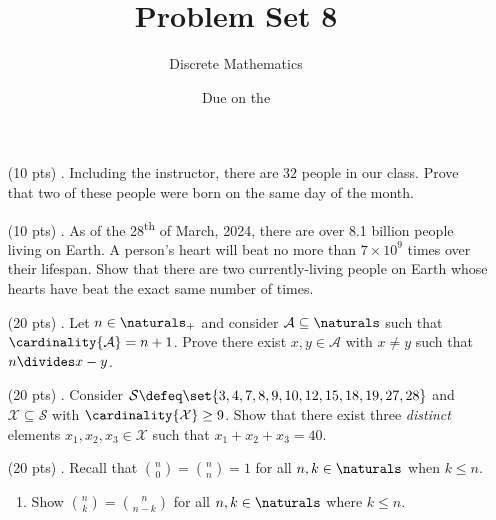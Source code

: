 

\title{Problem Set 8}
\author[Daniel Gonzalez Cedre]{Discrete Mathematics}
\date{Due on the }



\maketitle

\begin{enumerate}
  \item[(10 pts) \quad 1.]
    Including the instructor, there are $32$ people in our class.
    Prove that two of these people were born on the same day of the month.

  \item[(10 pts) \quad 2.]
    As of the 28\textsuperscript{th} of March, 2024, there are over 8.1 billion people living on Earth.%
    A person's heart will beat no more than $7 \times 10^9$ times over their lifespan.
    Show that there are two currently-living people on Earth whose hearts have beat the exact same number of times. 

  \item[(20 pts) \quad 3.]
    Let $n \in \naturals_+$ and consider $\mathcal{A} \subseteq \naturals$ such that $\cardinality{\mathcal{A}} = n + 1$.
    Prove there exist $x, y \in \mathcal{A}$ with $x \neq y$ such that $n \divides x - y$.

  \item[(20 pts) \quad 4.]
    Consider $\mathcal{S} \defeq \set{3, 4, 7, 8, 9, 10, 12, 15, 18, 19, 27, 28}$ and $\mathcal{X} \subseteq \mathcal{S}$ with $\cardinality{\mathcal{X}} \geq 9$.
    Show that there exist three \emph{distinct} elements $x_1, x_2, x_3 \in \mathcal{X}$ such that $x_1 + x_2 + x_3 = 40$.

  \item[(20 pts) \quad 5.]
    Recall that $\binom{n}{0} = \binom{n}{n} = 1$ for all $n, k \in \naturals$ when $k \leq n$.
    \begin{enumerate}
      \item
        Show $\binom{n}{k} = \binom{n}{n - k}$ for all $n, k \in \naturals$ where $k \leq n$.


\end{enumerate}
\end{enumerate}
